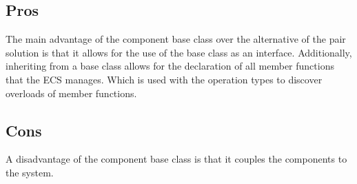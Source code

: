 \subsection{Pros}
The main advantage of the component base class over the alternative of the pair solution is that it allows for the use of the base class as an interface.
Additionally, inheriting from a base class allows for the declaration of all member functions that the ECS manages. Which is used with the operation types to discover overloads of member functions.

\subsection{Cons}
A disadvantage of the component base class is that it couples the components to the system.

